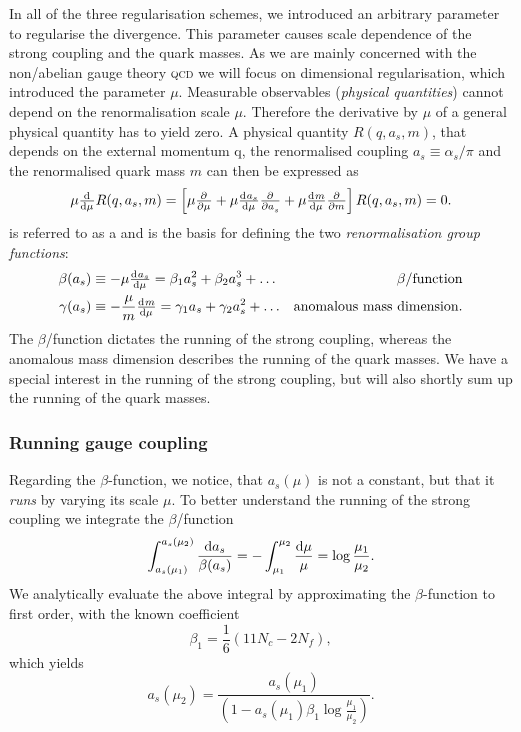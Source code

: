 \documentclass[../../index.tex]{subfiles}
\begin{document}
In all of the three regularisation schemes, we introduced an arbitrary parameter
to regularise the divergence. This parameter causes scale dependence of the
strong coupling and the quark masses. As we are mainly concerned with the
non\-/abelian gauge theory \textsc{qcd} we will focus on dimensional
regularisation, which introduced the parameter \(\mu\). Measurable observables
(\textit{physical quantities}) cannot depend on the renormalisation scale
\(\mu\). Therefore the derivative by \(\mu\) of a general physical quantity has
to yield zero. A physical quantity \(R(q, a_s, m)\), that depends on the
external momentum q, the renormalised coupling \(a_s\equiv\alpha_s/\pi\) and the
renormalised quark mass \(m\) can then be expressed as
\begin{equation}
  \label{eq:RGE}
  \mu \od{}{\mu}R(q, a_s, m) =
  \left[ \mu \pd{}{\mu} + \mu \od{a_s}{\mu} \pd{}{a_s} + \mu \od{m}{\mu} \pd{}{m} \right] R(q, a_s, m) = 0.
\end{equation}
 is referred to as a 
and is the basis for defining the two \textit{renormalisation group functions}:
\begin{align}
  \beta(a_s) &\equiv -\mu \od{a_s}{\mu} = \beta_1 a_s^2 + \beta_2 a_s^3 + \dots & \beta\text{\-/function}
                                                                                  \label{eq:betaFunction} \\
  \gamma(a_s) &\equiv - \frac{\mu}{m} \od{m}{\mu} = \gamma_1 a_s + \gamma_2 a_s^2 + \dots & \text{anomalous mass dimension}.
                                                                                            \label{eq:anomalousMassDimension}
\end{align}
The \(\beta\)\-/function dictates the running of the strong coupling, whereas
the anomalous mass dimension describes the running of the quark masses. We have
a special interest in the running of the strong coupling, but will also shortly
sum up the running of the quark masses.

\subsubsection{Running gauge coupling}
Regarding the \(\beta\)-function, we notice, that \(a_s(\mu)\) is not a constant,
but that it \textit{runs} by varying its scale \(\mu\). To better understand the
running of the strong coupling we integrate the \(\beta\)\-/function
\begin{equation}
  \int_{a_s(\mu_1)}^{a_s(\mu_2)}\frac{\dif a_s}{\beta(a_s)} = - \int_{\mu_1}^{\mu_2} \frac{\dif \mu}{\mu} = \log \frac{\mu_1}{\mu_2}.
\end{equation}
We analytically evaluate the above integral by approximating the
\(\beta\)-function to first order, with the known coefficient
\begin{equation}
  \label{eq:firstBetaCoefficient}
  \beta_1 = \frac{1}{6}(11 N_c - 2 N_f),
\end{equation}
which yields
\begin{equation}
  \label{eq:strongCouplingFirstOrder}
  a_s(\mu_2) = \frac{a_s(\mu_1)}{\left( 1 - a_s(\mu_1) \beta_1 \log\frac{\mu_1}{\mu_2} \right)}.
\end{equation}
\end{document}
